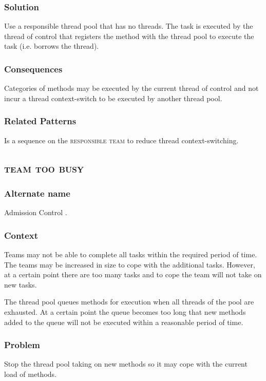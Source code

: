 \documentclass[prodmode]{style/acmlarge}
\begin{document}
\subsubsection*{Solution} Use a responsible thread pool that has no threads. 
The task is executed by the thread of control that registers the method with the
thread pool to execute the task (i.e. borrows the thread).

\subsubsection*{Consequences} Categories of methods may be executed by the
current thread of control and not incur a thread context-switch to be executed
by another thread pool.

\subsubsection*{Related Patterns} Is a sequence on the \textsc{responsible team}
to reduce thread context-switching.



\subsection{\textsc{\textbf{team too busy}}}

\subsubsection*{Alternate name} Admission Control \cite{seda}. 

\subsubsection*{Context} Teams may not be able to complete all tasks within the
required period of time.  The teams may be increased in size to cope with the
additional tasks.  However, at a certain point there are too many tasks and to
cope the team will not take on new tasks.

The thread pool queues methods for execution when all threads of the pool are
exhausted.  At a certain point the queue becomes too long that new methods added
to the queue will not be executed within a reasonable period of time.

\subsubsection*{Problem} Stop the thread pool taking on new methods so it may
cope with the current load of methods.
\end{document}
